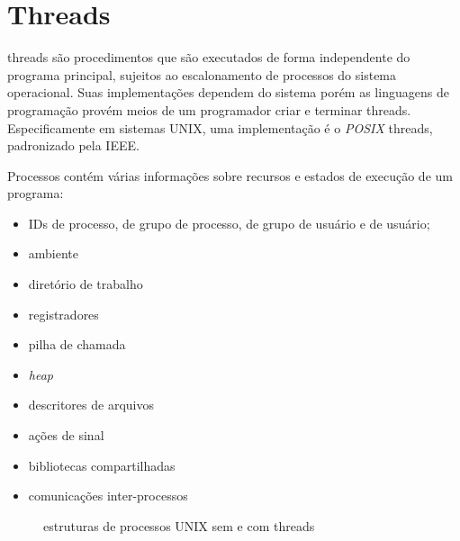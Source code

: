 
\section{Threads}

\begin{comment}
Dentro de um contexto de programas que utilizam a Internet e funcionalidades que chegam
próximas ao tempo real, processamentos pesados devem ser tratados com cautela a fim de
se manter a instantaneidade do processo. Aqui explicarei como o Transmission usa o
conceito de \emph{threads} para paralelizar esses processamentos e, com isso, conseguir
utilizar as informações de rápida mudança antes que seja necessário obtê-las novamente.
\end{comment}

\Glspl{thread} são procedimentos que são executados de forma independente do programa
principal, sujeitos ao escalonamento de processos do sistema operacional. Suas
implementações dependem do sistema porém as linguagens de programação provém meios de um
programador criar e terminar \glspl*{thread}. Especificamente em sistemas UNIX, uma
implementação é o \emph{POSIX} \Glspl*{thread}, padronizado pela IEEE.

Processos contém várias informações sobre recursos e estados de execução de um programa:

\begin{itemize}
    \item IDs de processo, de grupo de processo, de grupo de usuário e de usuário;
    \item ambiente
    \item diretório de trabalho
    \item registradores
    \item pilha de chamada
    \item \emph{heap}
    \item descritores de arquivos
    \item ações de sinal
    \item bibliotecas compartilhadas
    \item comunicações inter-processos
\end{itemize}

\begin{figure}[H]
    \centering
    \caption{estruturas de processos UNIX sem e com threads}
    \label{fig:threads}
\end{figure}


